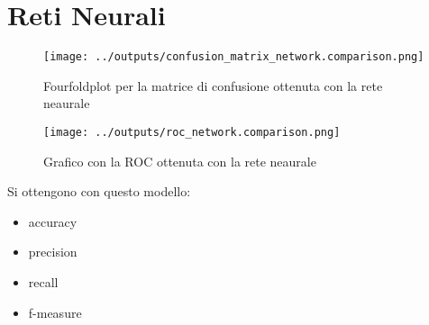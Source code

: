 \section{Reti Neurali}
\begin{figure}[H]
    \centering
    \texttt{[image: ../outputs/confusion\_matrix\_network.comparison.png]}
    \caption{Fourfoldplot per la matrice di confusione ottenuta con la rete neaurale}
\end{figure}
\begin{figure}[H]
    \centering
    \texttt{[image: ../outputs/roc\_network.comparison.png]}
    \caption{Grafico con la ROC ottenuta con la rete neaurale}
\end{figure}
Si ottengono con questo modello:
\begin{itemize}
    \item accuracy
    \item precision
    \item recall
    \item f-measure
\end{itemize}
